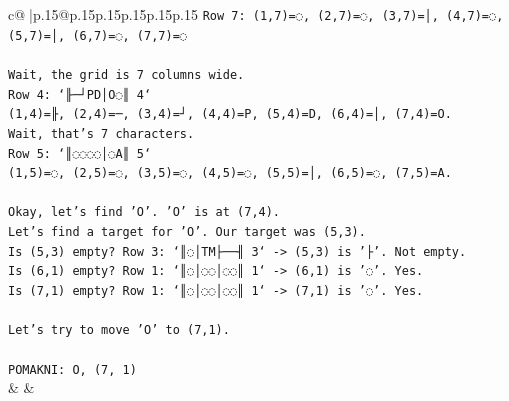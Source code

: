 \documentclass{article}
\begin{document}
{\begin{supertabular}{c@{$\;$}|p{.15\linewidth}@{}p{.15\linewidth}p{.15\linewidth}p{.15\linewidth}p{.15\linewidth}p{.15\linewidth}}
{{{\texttt{Row 7: (1,7)=◌, (2,7)=◌, (3,7)=│, (4,7)=◌, (5,7)=│, (6,7)=◌, (7,7)=◌} \\
\\ 
\texttt{Wait, the grid is 7 columns wide.} \\
\texttt{Row 4: `╟─┘PD│O◌║ 4`} \\
\texttt{(1,4)=╟, (2,4)=─, (3,4)=┘, (4,4)=P, (5,4)=D, (6,4)=│, (7,4)=O.} \\
\texttt{Wait, that's 7 characters.} \\
\texttt{Row 5: `║◌◌◌◌│◌A║ 5`} \\
\texttt{(1,5)=◌, (2,5)=◌, (3,5)=◌, (4,5)=◌, (5,5)=│, (6,5)=◌, (7,5)=A.} \\
\\ 
\texttt{Okay, let's find 'O'. 'O' is at (7,4).} \\
\texttt{Let's find a target for 'O'. Our target was (5,3).} \\
\texttt{Is (5,3) empty? Row 3: `║◌│TM├──╢ 3` {-}> (5,3) is '├'. Not empty.} \\
\texttt{Is (6,1) empty? Row 1: `║◌│◌◌│◌◌║ 1` {-}> (6,1) is '◌'. Yes.} \\
\texttt{Is (7,1) empty? Row 1: `║◌│◌◌│◌◌║ 1` {-}> (7,1) is '◌'. Yes.} \\
\\ 
\texttt{Let's try to move 'O' to (7,1).} \\
\\ 
\texttt{POMAKNI: O, (7, 1)} \\
            }
        }
    }
    & & \\ \\


\end{supertabular}}
\end{document}
